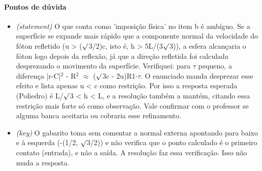 \documentclass{article}%
\begin{document}
\paragraph{Pontos de dúvida}%
\begin{itemize}%
\item%
\textit{(statement)} O que conta como 'imposição física' no item b é ambíguo. Se a superfície se expande mais rápido que a componente normal da velocidade do fóton refletido (u > ($\surd$3/2)c, isto é, h > 5L/(3$\surd$3)), a esfera alcançaria o fóton logo depois da reflexão, já que a direção refletida foi calculada desprezando o movimento da superfície. Verifiquei: para $\tau$ pequeno, a diferença |r-C|$^2$ - R$^2$ $\approx$ ($\surd$3c - 2u)R1$\cdot$$\tau$. O enunciado manda desprezar esse efeito e lista apenas u < c como restrição. Por isso a resposta esperada (Poliedro) é L/$\surd$3 < h < L, e a resolução também a mantém, citando essa restrição mais forte só como observação. Vale confirmar com o professor se alguma banca aceitaria ou cobraria esse refinamento.%
\item%
\textit{(key)} O gabarito toma sem comentar a normal externa apontando para baixo e à esquerda (-(1/2, $\surd$3/2)) e não verifica que o ponto calculado é o primeiro contato (entrada), e não a saída. A resolução faz essa verificação. Isso não muda a resposta.%
\end{itemize}%
\end{document}
